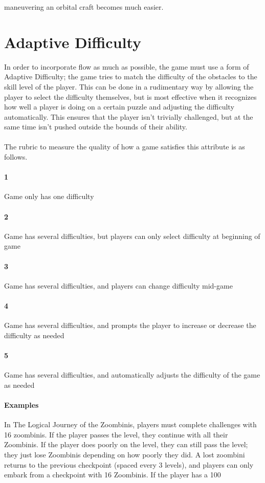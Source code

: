maneuvering an orbital craft becomes much easier.\section{Adaptive Difficulty}{In order to incorporate flow as much as possible, the game must use a form of Adaptive Difficulty; the game tries to match the difficulty of the obstacles to the skill level of the player. This can be done in a rudimentary way by allowing the player to select the difficulty themselves, but is most effective when it recognizes how well a player is doing on a certain puzzle and adjusting the difficulty automatically. This ensures that the player isn't trivially challenged, but at the same time isn't pushed outside the bounds of their ability.}\paragraph{}The rubric to measure the quality of how a game satisfies this attribute is as follows.\paragraph{1}{Game only has one difficulty}\paragraph{2}{Game has several difficulties, but players can only select difficulty at beginning of game}\paragraph{3}{Game has several difficulties, and players can change difficulty mid-game}\paragraph{4}{Game has several difficulties, and prompts the player to increase or decrease the difficulty as needed}\paragraph{5}{Game has several difficulties, and automatically adjusts the difficulty of the game as needed}\paragraph{Examples}In The Logical Journey of the Zoombinis, players must complete challenges with 16 zoombinis. If the player passes the level, they continue with all their Zoombinis. If the player does poorly on the level, they can still pass the level; they just lose Zoombinis depending on how poorly they did. A lost zoombini returns to the previous checkpoint (spaced every 3 levels), and players can only embark from a checkpoint with 16 Zoombinis. If the player has a 100%